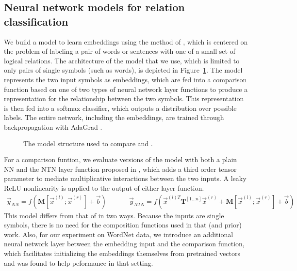 
\subsection*{Neural network models for relation classification} \label{methods}



We build a model to learn embeddings using the method of
\citet{Bowman:Potts:Manning:2014}, which is centered on the problem of
labeling a pair of words or sentences with one of a small set of
logical relations. The architecture of the model that we use, which is
limited to only pairs of single symbols (such as words), is depicted
in Figure~\ref{sample-figure}. The model represents the two input
symbols as embeddings, which are fed into a comparison function based
on one of two types of neural network layer functions to produce a
representation for the relationship between the two symbols. This
representation is then fed into a softmax classifier, which outputs a
distribution over possible labels. The entire network, including the
embeddings, are trained through backpropagation with AdaGrad
\cite{duchi2011adaptive}.

\begin{figure}[tp]
  \centering
  
  \caption{The model structure used to compare  and .} 
  \label{sample-figure}
\end{figure}


For a comparison funtion, we evaluate versions of the model with both
a plain NN and the NTN layer function proposed in
\citet{chen2013learning}, which adds a third order tensor parameter to
mediate multiplicative interactions between the two inputs. A leaky
ReLU nonlinearity \cite{maasrectifier} is applied to the output of
either layer function.
%
%
\begin{gather} \label{rnn}
\vec{y}_{\textit{NN}} = f(\mathbf{M} [\vec{x}^{(l)}; \vec{x}^{(r)}] + \vec{b}) ~~~~~~~~~~~~~~~ \vec{y}_{\textit{NTN}} = f(\vec{x}^{(l)T} \mathbf{T}^{[1 \ldots n]} \vec{x}^{(r)} + \mathbf{M} [\vec{x}^{(l)}; \vec{x}^{(r)}] + \vec{b})
\end{gather} 
%
%
This model differs from that of \citet{Bowman:Potts:Manning:2014} in
two ways. Because the inputs are single symbols, there is no need for
the composition functions used in that (and prior) work. Also, for our
experiment on WordNet data, we introduce an additional neural network
layer between the embedding input and the comparison function, which
facilitates initializing the embeddings themselves from pretrained
vectors and was found to help peformance in that setting.


